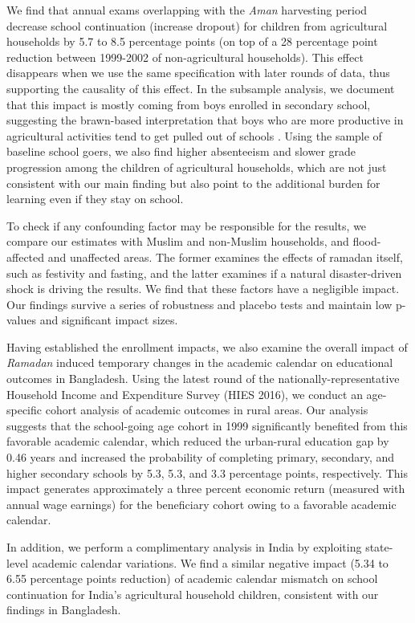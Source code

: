 \documentclass[12pt,letterpaper]{article}
\newcommand{\0}{\ensuremath{\mbox{\boldmath $0$}}}
\begin{document}
We find that annual exams overlapping with the \textit{Aman} harvesting period decrease school continuation (increase dropout) for children from agricultural households by 5.7 to 8.5 percentage points (on top of a 28 percentage point reduction between 1999-2002 of non-agricultural households). This effect disappears when we use the same specification with later rounds of data, thus supporting the causality of this effect. In the subsample analysis, we document that this impact is mostly coming from boys enrolled in secondary school, suggesting the brawn-based interpretation that boys who are more productive in agricultural activities tend to get pulled out of schools \citep{PittRosenzweigHassan2010}. Using the sample of baseline school goers, we also find higher absenteeism and slower grade progression among the children of agricultural households, which are not just consistent with our main finding but also point to the additional burden for learning even if they stay on school.  

To check if any confounding factor may be responsible for the results, we compare our estimates with Muslim and non-Muslim households, and flood-affected and unaffected areas. The former examines the effects of ramadan itself, such as festivity and fasting, and the latter examines if a natural disaster-driven shock is driving the results. We find that these factors have a negligible impact. Our findings survive a series of robustness and placebo tests and maintain low p-values and significant impact sizes. 

Having established the enrollment impacts, we also examine the overall impact of \textit{Ramadan} induced temporary changes in the academic calendar on educational outcomes in Bangladesh. Using the latest round of the nationally-representative Household Income and Expenditure Survey (HIES 2016), we conduct an age-specific cohort analysis of academic outcomes in rural areas. Our analysis suggests that the school-going age cohort in 1999 significantly benefited from this favorable academic calendar, which reduced the urban-rural education gap by 0.46 years and increased the probability of completing primary, secondary, and higher secondary schools by 5.3, 5.3, and 3.3 percentage points, respectively. This impact generates approximately a three percent economic return (measured with annual wage earnings) for the beneficiary cohort owing to a favorable academic calendar.

In addition, we perform a complimentary analysis in India by exploiting state-level academic calendar variations. We find a similar negative impact (5.34 to 6.55 percentage points reduction) of academic calendar mismatch on school continuation for India's agricultural household children, consistent with our findings in Bangladesh. 
\end{document}
